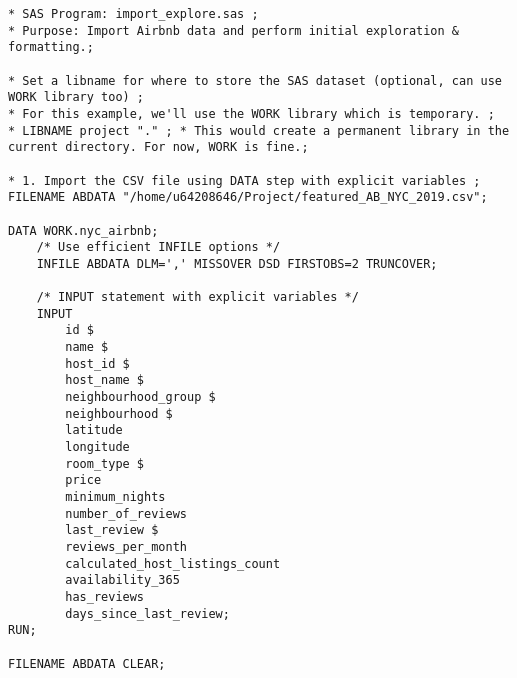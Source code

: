 \documentclass{article}
\begin{document}
\begin{lstlisting}[style=SASStyle, caption=CSV Import Configuration]
* SAS Program: import_explore.sas ;
* Purpose: Import Airbnb data and perform initial exploration & formatting.;

* Set a libname for where to store the SAS dataset (optional, can use WORK library too) ;
* For this example, we'll use the WORK library which is temporary. ;
* LIBNAME project "." ; * This would create a permanent library in the current directory. For now, WORK is fine.;

* 1. Import the CSV file using DATA step with explicit variables ;
FILENAME ABDATA "/home/u64208646/Project/featured_AB_NYC_2019.csv";

DATA WORK.nyc_airbnb;
    /* Use efficient INFILE options */
    INFILE ABDATA DLM=',' MISSOVER DSD FIRSTOBS=2 TRUNCOVER;

    /* INPUT statement with explicit variables */
    INPUT
        id $
        name $
        host_id $
        host_name $
        neighbourhood_group $
        neighbourhood $
        latitude
        longitude
        room_type $
        price
        minimum_nights
        number_of_reviews
        last_review $
        reviews_per_month
        calculated_host_listings_count
        availability_365
        has_reviews
        days_since_last_review;
RUN;

FILENAME ABDATA CLEAR;
\end{lstlisting}
\end{document}
